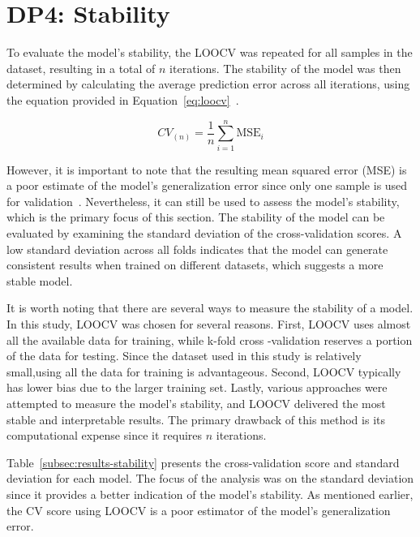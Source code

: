 \section{DP4: Stability}\label{sec:stability}

To evaluate the model's stability, the \ac{LOOCV} was repeated for all samples in the dataset, resulting in a total
of $n$ iterations. The stability of the model was then determined by calculating the average prediction error across
all iterations, using the equation provided in Equation~\ref{eq:loocv}~\cite[p. 201]{gareth2013introduction}.

\begin{tcolorbox}[arc=0pt,boxrule=0.5pt]
    \begin{equation}
        CV_{(n)} = \frac{1}{n} \sum_{i=1}^{n} \text{MSE}_{i}\label{eq:loocv}
    \end{equation}
\end{tcolorbox}

However, it is important to note that the resulting mean squared error (\ac{MSE}) is a poor estimate of the model's
generalization error since only one sample is used for validation~\cite[p. 201]{gareth2013introduction}.
Nevertheless, it can still be used to assess the model's stability, which is the primary focus of this section.
The stability of the model can be evaluated by examining the standard deviation of the cross-validation scores.
A low standard deviation across all folds indicates that the model can generate consistent results when trained on
different
datasets, which suggests a more stable model.

It is worth noting that there are several ways to measure the stability of a model. In this study, \ac{LOOCV} was
chosen for several reasons.
First, \ac{LOOCV} uses almost all the available data for training, while k-fold cross -validation reserves a portion
of the data for testing.
Since the dataset used in this study is relatively small,using all the data for training is advantageous.
Second, \ac{LOOCV} typically has lower bias due to the larger training set.
Lastly, various approaches were attempted to measure the model's stability, and \ac{LOOCV} delivered
the most stable and interpretable results.
The primary drawback of this method is its computational expense since it
requires $n$ iterations.

Table~\ref{subsec:results-stability} presents the cross-validation score and standard deviation for each model. The
focus of the analysis was on the standard deviation since it provides a better indication of the model's stability.
As mentioned earlier, the \ac{CV} score using \ac{LOOCV} is a poor estimator of the model's generalization error.

